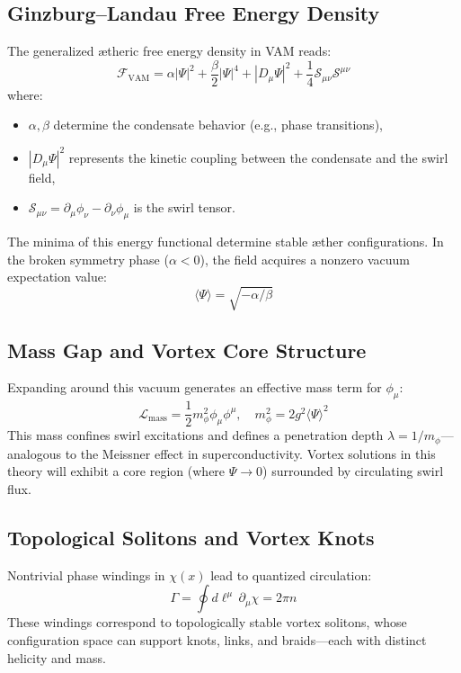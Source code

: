 \documentclass[a4paper,12pt]{article}
\begin{document}
        \subsection{Ginzburg--Landau Free Energy Density}
        The generalized ætheric free energy density in VAM reads:
        \begin{equation}
            \mathcal{F}_{\text{VAM}} = \alpha |\Psi|^2 + \frac{\beta}{2} |\Psi|^4 + |D_\mu \Psi|^2 + \frac{1}{4} \mathcal{S}_{\mu\nu} \mathcal{S}^{\mu\nu}
        \end{equation}
        where:
        \begin{itemize}
            \item $\alpha, \beta$ determine the condensate behavior (e.g., phase transitions),
            \item $|D_\mu \Psi|^2$ represents the kinetic coupling between the condensate and the swirl field,
            \item $\mathcal{S}_{\mu\nu} = \partial_\mu \phi_\nu - \partial_\nu \phi_\mu$ is the swirl tensor.
        \end{itemize}

        The minima of this energy functional determine stable æther configurations. In the broken symmetry phase ($\alpha < 0$), the field acquires a nonzero vacuum expectation value:
        \begin{equation}
            \langle \Psi \rangle = \sqrt{-\alpha/\beta}
        \end{equation}

        \subsection{Mass Gap and Vortex Core Structure}
        Expanding around this vacuum generates an effective mass term for $\phi_\mu$:
        \begin{equation}
            \mathcal{L}_{\text{mass}} = \frac{1}{2} m_\phi^2 \phi_\mu \phi^\mu, \quad m_\phi^2 = 2 g^2 \langle \Psi \rangle^2
        \end{equation}
        This mass confines swirl excitations and defines a penetration depth $\lambda = 1/m_\phi$---analogous to the Meissner effect in superconductivity. Vortex solutions in this theory will exhibit a core region (where $\Psi \rightarrow 0$) surrounded by circulating swirl flux.

        \subsection{Topological Solitons and Vortex Knots}
        Nontrivial phase windings in $\chi(x)$ lead to quantized circulation:
        \begin{equation}
            \Gamma = \oint d\ell^\mu \, \partial_\mu \chi = 2\pi n
        \end{equation}
        These windings correspond to topologically stable vortex solitons, whose configuration space can support knots, links, and braids---each with distinct helicity and mass.
\end{document}
